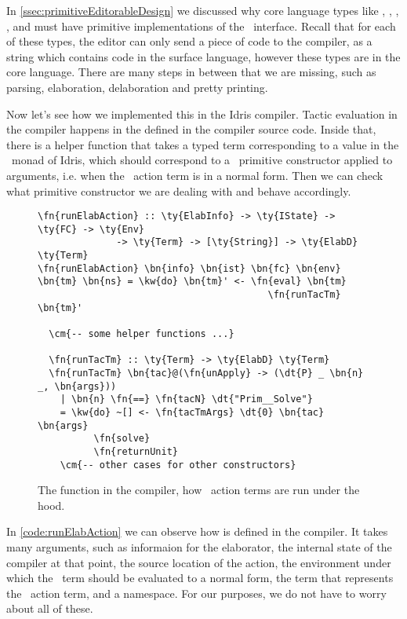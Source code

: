 In \autoref{ssec:primitiveEditorableDesign} we discussed why core language
types like , , , , and
 must have primitive implementations of the
\Editorable\ interface. Recall that for each of these types, the editor can
only send a piece of code to the compiler, as a string which contains code in
the surface language, however these types are in the core language. There are
many steps in between that we are missing, such as parsing, elaboration,
delaboration and pretty printing.

Now let's see how we implemented this in the Idris compiler. Tactic evaluation
in the compiler happens in the  defined in the compiler
source code. Inside that, there is a helper function  that takes a
typed term corresponding to a value in the \Elab\ monad of Idris, which should
correspond to a \Elab\ primitive constructor applied to arguments, i.e. when
the \Elab\ action term is in a normal form. Then we can check what primitive
constructor we are dealing with and behave accordingly.

\begin{figure}[ht]
\caption{The  function in the compiler, how \Elab\ action terms are run under the hood.}
\label{code:runElabAction}
\begin{Verbatim}[framesep=2mm, label=\footnotesize{\normalfont{Haskell}}, labelposition=topline]
\fn{runElabAction} :: \ty{ElabInfo} -> \ty{IState} -> \ty{FC} -> \ty{Env}
              -> \ty{Term} -> [\ty{String}] -> \ty{ElabD} \ty{Term}
\fn{runElabAction} \bn{info} \bn{ist} \bn{fc} \bn{env} \bn{tm} \bn{ns} = \kw{do} \bn{tm}' <- \fn{eval} \bn{tm}
                                         \fn{runTacTm} \bn{tm}'

  \cm{-- some helper functions ...}

  \fn{runTacTm} :: \ty{Term} -> \ty{ElabD} \ty{Term}
  \fn{runTacTm} \bn{tac}@(\fn{unApply} -> (\dt{P} _ \bn{n} _, \bn{args}))
    | \bn{n} \fn{==} \fn{tacN} \dt{"Prim__Solve"}
    = \kw{do} ~[] <- \fn{tacTmArgs} \dt{0} \bn{tac} \bn{args}
          \fn{solve}
          \fn{returnUnit}
    \cm{-- other cases for other constructors}
\end{Verbatim}
\end{figure}

In \autoref{code:runElabAction} we can observe how  is
defined in the compiler.
It takes many arguments, such as informaion for the elaborator, the internal
state of the compiler at that point, the source location of the action, the
environment under which the \Elab\ term should be evaluated to a normal form, the
term that represents the \Elab\ action term, and a namespace.  For our purposes,
we do not have to worry about all of these.

